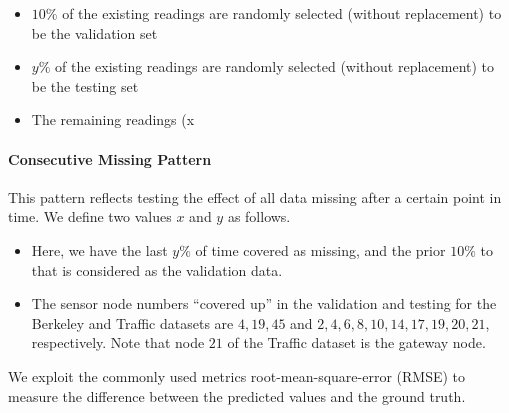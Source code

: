 \begin{itemize}
\item $10\%$ of the existing readings are randomly selected (without replacement) to be the validation set
\item $y\%$ of the existing readings are randomly selected (without replacement) to be the testing set
\item The remaining readings (x%
\end{itemize}
\paragraph*{Consecutive Missing Pattern}

This pattern reflects testing the effect of all data missing after a certain point in time.
We define two values $x$ and $y$ as follows.

\begin{itemize}
\item Here, we have the last $y\%$ of time covered as missing, and the prior $10\%$ to that is considered as the validation data.
\item The sensor node numbers ``covered up'' in the validation and testing for the Berkeley and Traffic datasets are ${4,19,45}$ and ${2,4,6,8,10,14,17,19,20,21}$, respectively.
Note that node $21$ of the Traffic dataset is the gateway node.
\end{itemize}
We exploit the commonly used metrics root-mean-square-error (RMSE) to measure the difference between the predicted values and the ground truth. 